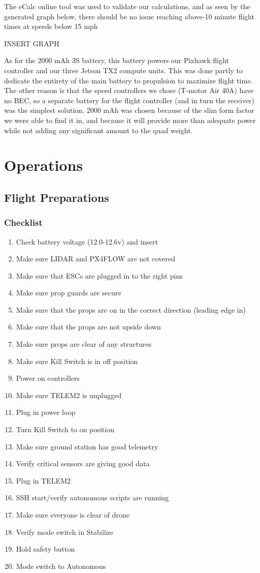 \documentclass[12pt,letterpaper]{article}
\begin{document}
		The eCalc online tool was used to validate our calculations, and as seen by the generated graph below, there should be no issue reaching above-10 minute flight times at speeds below 15 mph

		INSERT GRAPH

		As for the 2000 mAh 3S battery, this battery powers our Pixhawk flight controller and our three Jetson TX2 compute units. This was done partly to dedicate the entirety of the main battery to propulsion to maximize flight time. The other reason is that the speed controllers we chose (T-motor Air 40A) have no BEC, so a separate battery for the flight controller (and in turn the receiver) was the simplest solution. 2000 mAh was chosen because of the slim form factor we were able to find it in, and because it will provide more than adequate power while not adding any significant amount to the quad weight.


\section*{Operations}
	\subsection*{Flight Preparations}
		\subsubsection*{Checklist}
			\begin{enumerate}
				\item Check battery voltage (12.0-12.6v) and insert
				\item Make sure LIDAR and PX4FLOW are not covered
				\item Make sure that ESCs are plugged in to the right pins
				\item Make sure prop guards are secure
				\item Make sure that the props are on in the correct direction (leading edge in)
				\item Make sure that the props are not upside down
				\item Make sure props are clear of any structures
				\item Make sure Kill Switch is in off position
				\item Power on controllers
				\item Make sure TELEM2 is unplugged
				\item Plug in power loop
				\item Turn Kill Switch to on position
				\item Make sure ground station has good telemetry
				\item Verify critical sensors are giving good data
				\item Plug in TELEM2
				\item SSH start/verify autonomous scripts are running
				\item Make sure everyone is clear of drone
				\item Verify mode switch in Stabilize
				\item Hold safety button
				\item Mode switch to Autonomous
			\end{enumerate}
\end{document}
